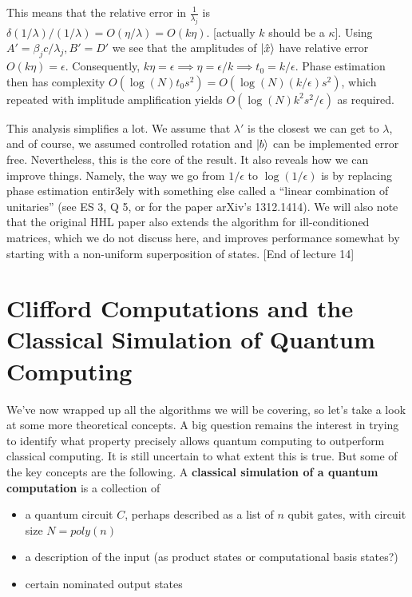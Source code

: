 \documentclass{article}
\theoremstyle{definition}
\begin{document}
This means that the relative error in $\frac{1}{\lambda_j}$ is $\delta(1 /
\lambda) / (1 / \lambda) = O(\eta / \lambda) = O(k \eta)$. [actually $k$ should
be a $\kappa$]. Using $A' = \beta_j c / \lambda_j, B' = D'$ we see that the
amplitudes of $\ket{\hat{x}}$ have relative error $O(k \eta) = \epsilon$.
Consequently, $k \eta = \epsilon \implies \eta = \epsilon / k \implies t_0 = k /
\epsilon$. Phase estimation then has complexity $O(\log(N) t_0 s^2) = O(\log(N) (k /
\epsilon) s^2)$, which repeated with implitude amplification yields $O(\log(N)
k^2 s^2 / \epsilon)$ as required.

This analysis simplifies a lot. We assume that $\lambda'$ is the closest we can
get to $\lambda$, and of course, we assumed controlled rotation and $\ket{b}$
can be implemented error free. Nevertheless, this is the core of the result. It
also reveals how we can improve things. Namely, the way we go from $1 /
\epsilon$ to $\log(1 / \epsilon)$ is by replacing phase estimation entir3ely
with something else called a ``linear combination of unitaries'' (see ES 3, Q 5,
or for the paper arXiv's 1312.1414). We will also note that the original HHL
paper also extends the algorithm for ill-conditioned matrices, which we do not
discuss here, and improves performance somewhat by starting with a non-uniform
superposition of states. [End of lecture 14]

\section{Clifford Computations and the Classical Simulation of Quantum
  Computing}

We've now wrapped up all the algorithms we will be covering, so let's take a
look at some more theoretical concepts. A big question remains the interest in
trying to identify what property precisely allows quantum computing to
outperform classical computing. It is still uncertain to what extent this is
true. But some of the key concepts are the following. A \textbf{classical
  simulation of a quantum computation} is a collection of

\begin{itemize}
\item a quantum circuit $C$, perhaps described as a list of $n$ qubit gates,
  with circuit size $N = poly(n)$
\item a description of the input (as product states or computational basis
  states?)
\item certain nominated output states
\end{itemize}
\end{document}
